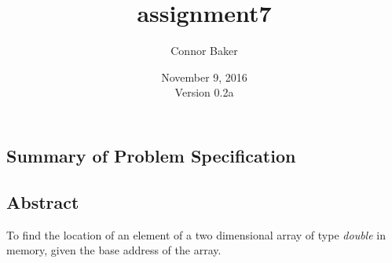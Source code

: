 \documentclass[12pt]{article}
\begin{document}
\null
\nointerlineskip 
\vfill
\let \snewpage \newpage
\let \newpage \relax
    \title{assignment7}
    \author{Connor Baker}
    \date{November 9, 2016\\Version 0.2a}
\maketitle
\let \newpage \snewpage
\vfill
\thispagestyle{empty}



\newpage %



\makeatletter
{}
\renewcommand*\l@section{\@dottedtocline{1}{0em}{1.5em}}
\makeatother
\tableofcontents

\clearpage
{}

\begin{center}
\section{Summary of Problem Specification}
\end{center}
\subsection{Abstract}
To find the location of an element of a two dimensional array of type \textit{double} in memory, given the base address of the array.
\end{document}
